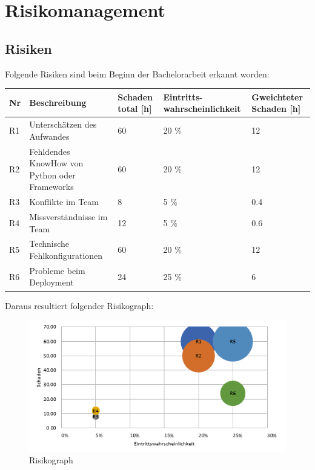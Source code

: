 \section{Risikomanagement}
\subsection{Risiken}
Folgende Risiken sind beim Beginn der Bachelorarbeit erkannt worden:
\begin{center}
	\begin{tabularx}{\textwidth}{p{} p{} p{} p{} p{}}
	\toprule
	Nr & Beschreibung & Schaden total [h] & Eintritts-wahrscheinlichkeit & Gweichteter Schaden [h]\\ \midrule
	R1 & Unterschätzen des Aufwandes & 60 & 20 \% & 12 \\
	R2 & Fehldendes KnowHow von \newline Python oder Frameworks & 60 & 20 \% & 12 \\
	R3 & Konflikte im Team & 8 & 5 \% & 0.4 \\
	R4 & Missverständnisse im Team & 12 & 5 \% & 0.6 \\
	R5 & Technische \newline Fehlkonfigurationen & 60 & 20 \% & 12 \\
	R6 & Probleme beim Deployment & 24 & 25 \% & 6 \\ \bottomrule
	\end{tabularx}
\end{center}

\medskip \noindent
Daraus resultiert folgender Risikograph: 
\begin{figure}[H]
	\includegraphics[width=\textwidth,height=\textheight,keepaspectratio]{images/risikoanalyse.png}
	\caption{Risikograph}
\end{figure}

